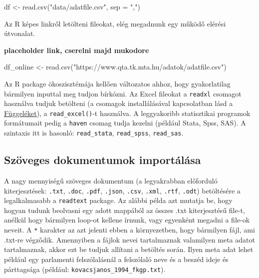\documentclass[
]{book}
\newenvironment{Shaded}{\begin{snugshade}}{\end{snugshade}}
\newcommand{\AttributeTok}[1]{\textcolor[rgb]{0.77,0.63,0.00}{#1}}
\newcommand{\FunctionTok}[1]{\textcolor[rgb]{0.00,0.00,0.00}{#1}}
\newcommand{\NormalTok}[1]{#1}
\newcommand{\OtherTok}[1]{\textcolor[rgb]{0.56,0.35,0.01}{#1}}
\newcommand{\StringTok}[1]{\textcolor[rgb]{0.31,0.60,0.02}{#1}}
\begin{document}
\begin{Shaded}
\begin{Highlighting}[]
\NormalTok{df }\OtherTok{\textless{}{-}} \FunctionTok{read.csv}\NormalTok{(}\StringTok{"data/adatfile.csv"}\NormalTok{, }\AttributeTok{sep =} \StringTok{","}\NormalTok{)}
\end{Highlighting}
\end{Shaded}

Az R képes linkről letölteni fileokat, elég megadnunk egy működő elérési
útvonalat.

\textbf{placeholder link, cserelni majd mukodore}

\begin{Shaded}
\begin{Highlighting}[]
\NormalTok{df\_online }\OtherTok{\textless{}{-}} \FunctionTok{read.csv}\NormalTok{(}\StringTok{"https://www.qta.tk.mta.hu/adatok/adatfile.csv"}\NormalTok{)}
\end{Highlighting}
\end{Shaded}

Az R package ökoszisztémája kellően változatos ahhoz, hogy gyakorlatilag
bármilyen inputtal meg tudjon bírkózni. Az Excel fileokat a
\texttt{readxl} csomagot használva tudjuk betölteni (a csomagok
installálásával kapcsolatban lásd a
\protect\hyperlink{packages}{Függeléket}), a \texttt{read\_excel()}-t
használva. A leggyakoribb statisztikai programok formátumait pedig a
\texttt{haven} csomag tudja kezelni (például Stata, Spss, SAS). A
szintaxis itt is hasonló: \texttt{read\_stata}, \texttt{read\_spss},
\texttt{read\_sas}.

\hypertarget{szuxf6veges-dokumentumok-importuxe1luxe1sa}{%
\subsection{Szöveges dokumentumok
importálása}\label{szuxf6veges-dokumentumok-importuxe1luxe1sa}}

A nagy mennyiségű szöveges dokumentum (a legyakrabban előforduló
kiterjesztések: \texttt{.txt}, \texttt{.doc}, \texttt{.pdf},
\texttt{.json}, \texttt{.csv}, \texttt{.xml}, \texttt{.rtf},
\texttt{.odt}) betöltésére a legalkalmasabb a \texttt{readtext} package.
Az alábbi példa azt mutatja be, hogy hogyan tudunk beolvasni egy adott
mappából az összes .txt kiterjesztésű file-t, anélkül hogy bármilyen
loop-ot kellene írnunk, vagy egyenként megadni a file-ok neveit. A
\texttt{*} karakter az azt jelenti ebben a környezetben, hogy bármilyen
fájl, ami .txt-re végződik. Amennyiben a fájlok nevei tartalmaznak
valamilyen meta adatot tartalmaznak, akkor ezt be tudjuk allítani a
betöltés során. Ilyen meta adat lehet például egy parlamenti
felszólalásnál a felszólaló neve és a beszéd ideje és párttagsága
(például: \texttt{kovacsjanos\_1994\_fkgp.txt}).
\end{document}
